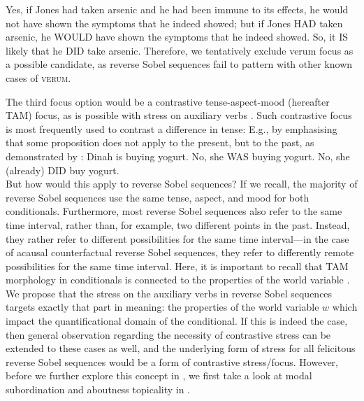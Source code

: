 \ex{}
Yes, if Jones had taken arsenic and he had been immune to its effects, he would not have shown the symptoms that he indeed showed; but if Jones \MakeUppercase{had} taken arsenic, he \MakeUppercase{would} have shown the symptoms that he indeed showed. So, it \MakeUppercase{is} likely that he \MakeUppercase{did} take arsenic.
\xe
Therefore, we tentatively exclude verum focus as a possible candidate, as reverse Sobel sequences fail to pattern with other known cases of {\scshape verum}.%

The third focus option would be a contrastive tense-aspect-mood (hereafter TAM) focus, as is possible with stress on auxiliary verbs \parencite[p.~12f, footnote~3]{Goodhue2018}. Such contrastive focus is most frequently used to contrast a difference in tense: E.g., by emphasising that some proposition does not apply to the present, but to the past, as demonstrated by :
\pex[nopreamble=true]%
\a{} {} Dinah is buying yogurt.
\a{} {} No, she \MakeUppercase{was} buying yogurt.
\a{} {} No, she (already) \MakeUppercase{did} buy yogurt.\\\emptyfill\parencite[p.~13, footnote~3]{Goodhue2018}
\xe
But how would this apply to reverse Sobel sequences? If we recall, the majority of reverse Sobel sequences use the same tense, aspect, and mood for both conditionals. Furthermore, most reverse Sobel sequences also refer to the same time interval, rather than, for example, two different points in the past. Instead, they rather refer to different possibilities for the same time interval---in the case of acausal counterfactual reverse Sobel sequences,  they refer to differently remote possibilities for the same time interval. Here, it is important to recall that TAM morphology in conditionals is connected to the properties of the world variable \parencites{Palmer1986}{Iatridou2000}{Arregui2009}{Romero2014}[amongst others]{Schulz2014}. We propose that the stress on the auxiliary verbs in reverse Sobel sequences targets exactly that part in meaning: the properties of the world variable $w$ which impact the quantificational domain of the conditional. If this is indeed the case, then  general observation regarding the necessity of contrastive stress can be extended to these cases as well, and the underlying form of stress for all felicitous reverse Sobel sequences would be a form of contrastive stress/focus. However, before we further explore this concept in , we first take a look at modal subordination and aboutness topicality in .


